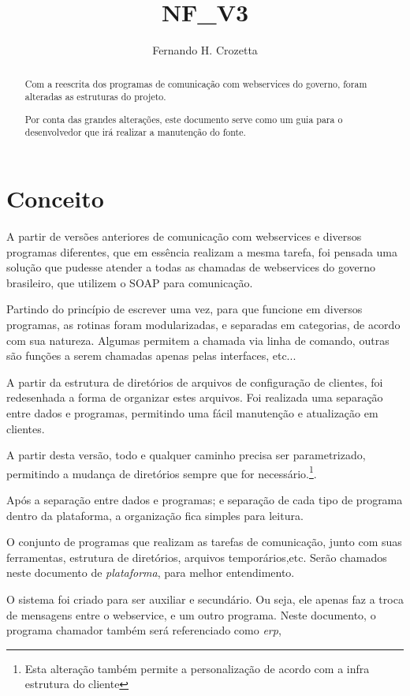 \documentclass[a4paper]{article}
\title{NF\_V3}
\author{Fernando H. Crozetta}
\newcommand{\dev}{desenvolvedor }
\begin{document}
\maketitle

\begin{abstract}
Com a reescrita dos programas de comunicação com webservices do governo, foram alteradas as estruturas do projeto.

Por conta das grandes alterações, este documento serve como um guia para o \dev  que irá realizar a manutenção do fonte.
\end{abstract}
\pagebreak

{\def\makebox[#1][#2]#3{#3}%
	\tableofcontents %
}
\pagebreak
\section{Conceito}
A partir de versões anteriores de comunicação com webservices e diversos programas diferentes, que em essência realizam a mesma tarefa, foi pensada uma solução que pudesse atender a todas as chamadas de webservices do governo brasileiro, que utilizem o SOAP para comunicação.

Partindo do princípio de escrever uma vez, para que funcione em diversos programas, as rotinas foram modularizadas, e separadas em categorias, de acordo com sua natureza. Algumas permitem a chamada via linha de comando, outras são funções a serem chamadas apenas pelas interfaces, etc...

A partir da estrutura de diretórios de arquivos de configuração de clientes, foi redesenhada a forma de organizar estes arquivos.
Foi realizada uma separação entre dados e programas, permitindo uma fácil manutenção e atualização em clientes.

A partir desta versão, todo e qualquer caminho precisa ser parametrizado, permitindo a mudança de diretórios sempre que for necessário.\footnote{Esta alteração também permite a personalização de acordo com a infra estrutura do cliente}.

Após a separação entre dados e programas; e separação de cada tipo de programa dentro da plataforma, a organização fica simples para leitura.

O conjunto de programas que realizam as tarefas de comunicação, junto com suas ferramentas, estrutura de diretórios, arquivos temporários,etc. Serão chamados neste documento de \emph{plataforma}, para melhor entendimento.

O sistema foi criado para ser auxiliar e secundário. Ou seja, ele apenas faz a troca de mensagens entre o webservice, e um outro programa. Neste documento, o programa chamador também será referenciado como \emph{erp}, 
\end{document}
